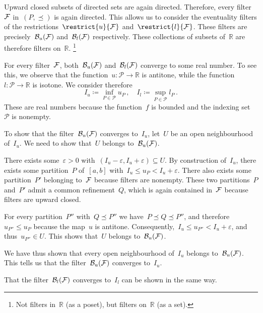 Upward closed subsets of directed sets are again directed.
Therefore, every filter~$\mathcal{F}$ in~$(P, ⪯)$ is again directed.
This allows us to consider the eventuality filters of the restrictions~$\restrict{u}{\filter{F}}$ and~$\restrict{l}{\filter{F}}$.
These filters are precisely~$\mathcal{B}_u(\mathcal{F})$ and~$\mathcal{B}_l(\mathcal{F})$ respectively.
These collections of subsets of~$ℝ$ are therefore filters on~$ℝ$.%
\footnote{
	Not filters in~$ℝ$ (as a poset), but filters on~$ℝ$ (as a set).
}

For every filter~$\mathcal{F}$, both~$\mathcal{B}_u(\mathcal{F})$ and~$\mathcal{B}_l(\mathcal{F})$ converge to some real number.
To see this, we observe that the function~$u \colon \mathcal{P} \to ℝ$ is antitone, while the function~$l \colon \mathcal{P} \to ℝ$ is isotone.
We consider therefore
\[
	I_u ≔ \inf_{P ∈ \mathcal{P}} u_P \,,
	\quad
	I_l ≔ \sup_{P ∈ \mathcal{P}} l_P \,.
\]
These are real numbers because the function~$f$ is bounded and the indexing set~$\mathcal{P}$ is nonempty.

To show that the filter~$\mathcal{B}_u(\mathcal{F})$ converges to~$I_u$, let~$U$ be an open neighbourhood of~$I_u$.
We need to show that~$U$ belongs to~$\mathcal{B}_u(\mathcal{F})$.

There exists some~$ε > 0$ with~$(I_u - ε, I_u + ε) ⊆ U$.
By construction of~$I_u$, there exists some partition~$P$ of~$[a, b]$ with~$I_u ≤ u_P < I_u + ε$.
There also exists some partition~$P'$ belonging to~$\mathcal{F}$ because filters are nonempty.
These two partitions~$P$ and~$P'$ admit a common refinement~$Q$, which is again contained in~$\mathcal{F}$ because filters are upward closed.

For every partition~$P''$ with~$Q ⪯ P''$ we have~$P ⪯ Q ⪯ P''$, and therefore~$u_{P''} ≤ u_P$ because the map~$u$ is antitone.
Consequently,~$I_u ≤ u_{P''} < I_u + ε$, and thus~$u_{P''} ∈ U$.
This shows that~$U$ belongs to~$\mathcal{B}_u(\mathcal{F})$.

We have thus shown that every open neighbourhood of~$I_u$ belongs to~$\mathcal{B}_u(\mathcal{F})$.
This tells us that the filter~$\mathcal{B}_u(\mathcal{F})$ converges to~$I_u$.

That the filter~$\mathcal{B}_l(\mathcal{F})$ converges to~$I_l$ can be shown in the same way.
